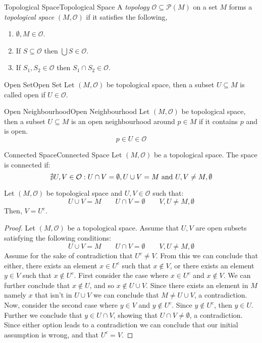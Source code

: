 \documentclass{article}
\newcommand{\tp}{\mathcal{O}}
\newcommand{\pset}[1]{\mathcal{P}(#1)}
\begin{document}
\begin{definition}{Topological Space}{Topological Space}
    A \emph{topology} $\tp \subseteq \pset{M}$ on a set $M$ forms a \emph{topological space} $(M, \tp)$ if it satisfies the following,

    \begin{enumerate}[label=(\roman*)]
        \item $\emptyset, M \in \tp$.
        \item If $S \subseteq \tp$ then $\bigcup S \in \tp$.
        \item If $S_1, S_2 \in \tp$ then $S_1 \cap S_2 \in \tp$.
    \end{enumerate}
\end{definition}


\begin{terminology}{Open Set}{Open Set}
    Let $(M, \tp)$ be topological space, then a subset $U \subseteq M$ is called open if $U \in \tp$.
\end{terminology}

\begin{terminology}{Open Neighbourhood}{Open Neighbourhood}
    Let $(M, \tp)$ be topological space, then a subset $U \subseteq M$ is an open neighbourhood around $p \in M$ if it contains $p$ and is open.
    $$p \in U \in \tp$$
\end{terminology}

\begin{definition}{Connected Space}{Connected Space}
    Let $(M, \tp)$ be a topological space. The space is connected if:
    $$\nexists U, V \in \tp:  U \cap V = \emptyset, U \cup V = M \tand U, V \neq M, \emptyset$$
\end{definition}

\begin{proposition}{}{}
    Let $(M, \tp)$ be topological space and $U, V \in \tp$ such that:
    $$U \cup V = M \qquad U \cap V = \emptyset \qquad V, U \neq M, \emptyset$$
    Then, $V = U^c$.
\end{proposition}

\begin{proof}
    Let $(M, \tp)$ be a topological space.
    Assume that $U, V$ are open subsets satisfying the following conditions:
    $$U \cup V = M \qquad U \cap V = \emptyset \qquad V, U \neq M, \emptyset$$
    Assume for the sake of contradiction that $U^c \neq V$.
    From this we can conclude that either,
    there exists an element $x \in U^c$ such that $x \notin V$,
    or there exists an element $y \in V$ such that $x \notin U^c$.
    First consider the case where $x \in U^c$ and $x \notin V$.
    We can further conclude that $x \notin U$, and so $x \notin U \cup V$.
    Since there exists an element in $M$ namely $x$ that isn't in $U \cup V$ we can conclude that $M \neq U \cup V$, a contradiction.
    Now, consider the second case where $y \in V$ and $y \notin U^c$.
    Since $y \notin U^c$, then $y \in U$.
    Further we conclude that $y \in U \cap V$, showing that $U \cap V \neq \emptyset$, a contradiction.
    Since either option leads to a contradiction we can conclude that our initial assumption is wrong, and that $U^c = V$.
\end{proof}
\end{document}
